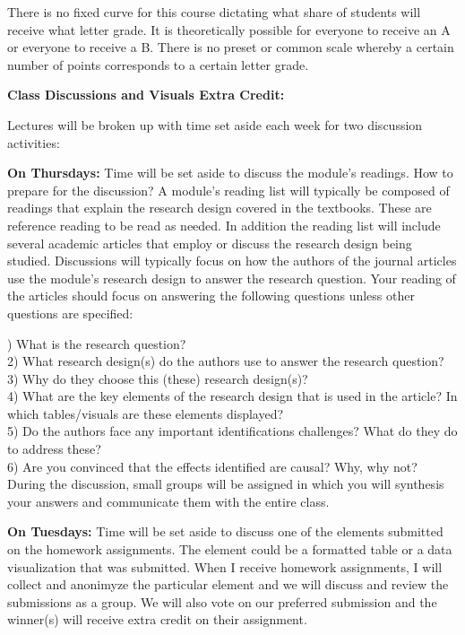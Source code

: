 \documentclass[a4paper, 10pt]{article}
\begin{document}
\noindent There is no fixed curve for this course dictating what share of students will receive what letter grade. It is theoretically possible for everyone to receive an A or everyone to receive a B. There is no preset or common scale whereby a certain number of points corresponds to a certain letter grade.  

\noindent\textbf{Class Discussions and Visuals Extra Credit:}

\noindent Lectures will be broken up with time set aside each week for two discussion activities:
 
\noindent \textbf{On Thursdays:} Time will be set aside to discuss the module's readings. 
How to prepare for the discussion? A module's reading list will typically be composed of readings that explain the research design covered in the textbooks. These are reference reading to be read as needed. In addition the reading list will include several academic articles that employ or discuss the research design being studied. Discussions will typically focus on how the authors of the journal articles use the module's research design to answer the research question. Your reading of the articles should focus on answering the following questions unless other questions are specified:

) What is the research question?\\
2) What research design(s) do the authors use to answer the research question? \\
3) Why do they choose this (these) research design(s)?\\
4) What are the key elements of the research design that is used in the article? In which tables/visuals are these elements displayed?\\
5) Do the authors face any important identifications challenges? What do they do to address these?\\
6) Are you convinced that the effects identified are causal? Why, why not?\\

\noindent During the discussion, small groups will be assigned in which you will synthesis your answers and communicate them with the entire class. 

\noindent \textbf{On Tuesdays:} Time will be set aside to discuss one of the elements submitted on the homework assignments. The element could be a formatted table or a data visualization that was submitted. When I receive homework assignments, I will collect and anonimyze the particular element and we will discuss and review the submissions as a group. We will also vote on our preferred submission and the winner(s) will receive extra credit on their assignment. 
\end{document}
